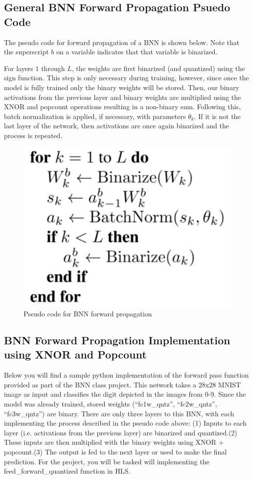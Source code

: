 \subsection{General BNN Forward Propagation Psuedo Code}
The pseudo code for forward propagation of a BNN is shown below. Note that the superscript $b$ on a variable indicates that that variable is binarized. 

For layers $1$ through $L$, the weights are first binarized (and quantized) using the sign function. This step is only necessary during training, however, since once the model is fully trained only the binary weights will be stored. Then, our binary activations from the previous layer and binary weights are multiplied using the XNOR and popcount operations resulting in a non-binary sum. Following this, batch normalization is applied, if necessary, with parameters $\theta_k$. If it is not the last layer of the network, then activations are once again binarized and the process is repeated. 

\begin{figure}[htbp]
\centerline{\includegraphics[scale = .65]{images/forward.png}}
\caption{Pseudo code for BNN forward propagation}
\label{fig:forward}
\end{figure}

\subsection{BNN Forward Propagation Implementation using XNOR and Popcount}
Below you will find a sample python implementation of the forward pass function provided as part of the BNN class project. This network takes a 28x28 MNIST image as input and classifies the digit depicted in the images from 0-9. Since the model was already trained, stored weights (``fc1w\_qntz'', ``fc2w\_qntz'', ``fc3w\_qntz'') are binary. There are only three layers to this BNN, with each implementing the process described in the pseudo code above: (1) Inputs to each layer (i.e. activations from the previous layer) are binarized and quantized.(2) These inputs are then multiplied with the binary weights using XNOR + popcount.(3) The output is fed to the next layer or used to make the final prediction. For the project, you will be tasked will implementing the feed\_forward\_quantized function in HLS. \\


